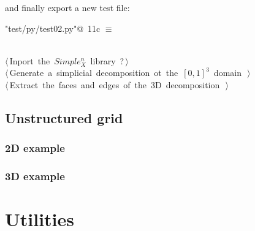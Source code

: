 \documentclass[11pt,oneside]{article}	%
\begin{document}
and finally export a new test file:

\begin{flushleft} \small \label{scrap16}
\protect{}\verb@"test/py/test02.py"@\nobreak\ {\footnotesize 11c }$\equiv$
\vspace{-1ex}
\begin{list}{}{} \item
\mbox{}\verb@@\\
\mbox{}\verb@@\hbox{$\langle\,$Inport the $Simple_X^n$ library\nobreak\ {\footnotesize ?}$\,\rangle$}\verb@@\\
\mbox{}\verb@@\hbox{$\langle\,$Generate a simplicial decomposition ot the $[0,1]^3$ domain\nobreak\ {\footnotesize {}}$\,\rangle$}\verb@@\\
\mbox{}\verb@@\hbox{$\langle\,$Extract the faces and edges of the 3D decomposition\nobreak\ {\footnotesize {}}$\,\rangle$}\verb@@\\
\mbox{}\verb@@{\NWsep}
\end{list}
\vspace{-2ex}
\end{flushleft}


\subsection{Unstructured grid}


\subsubsection{2D example}


\subsubsection{3D example}


\appendix
\section{Utilities}
\end{document}
